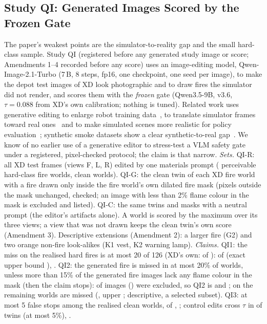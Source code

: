 \subsection{Study QI: Generated Images Scored by the Frozen Gate}\label{sec:moved-qi}
The paper's weakest points are the simulator-to-reality gap and the small hard-class sample. Study QI (registered before any generated study image or score; Amendments 1--4 recorded before any score) uses an image-editing model, Qwen-Image-2.1-Turbo (7\,B, 8 steps, fp16, one checkpoint, one seed per image), to make the depot test images of XD look photographic and to draw fires the simulator did not render, and scores them with the \emph{frozen} gate (Qwen3.5-9B, v3.6, $\tau=0.088$ from XD's own calibration; nothing is tuned). Related work uses generative editing to enlarge robot training data~\cite{yu2023rosie}, to translate simulator frames toward real ones~\cite{alhaija2025cosmostransfer,samak2025sim2realdiffusion} and to make simulated scenes more realistic for policy evaluation~\cite{benarous2025spie,li2024simpler}; synthetic smoke datasets show a clear synthetic-to-real gap~\cite{gaba2025wildfiresynthetic}. We know of no earlier use of a generative editor to stress-test a VLM safety gate under a registered, pixel-checked protocol; the claim is that narrow.
\emph{Sets.} QI-R: all XD test frames (views F, L, R) edited by one materials prompt (\QIRN{} perceivable hard-class fire worlds, \QIRCleanN{} clean worlds). QI-G: the clean twin of each XD fire world with a fire drawn only inside the fire world's own dilated fire mask (pixels outside the mask unchanged, checked; an image with less than 2\% flame colour in the mask is excluded and listed). QI-C: the same twins and masks with a neutral prompt (the editor's artifacts alone). A world is scored by the maximum over its three views; a view that was not drawn keeps the clean twin's own score (Amendment 3). Descriptive extensions (Amendment 2): a larger fire (G2) and two orange non-fire look-alikes (K1 vest, K2 warning lamp).
\emph{Claims.} QI1: the miss on the realised hard fires is at most 20 of 126 (XD's own: \QIBaseMiss{} of \QIBaseN): \QIRMiss{} of \QIRN{} (exact upper bound \QIRUpper), \QIClaimQIOne. QI2: the generated fire is missed in at most 20\% of worlds, unless more than 15\% of the generated fire images lack any flame colour in the mask (then the claim stops): \QIGExcl{} of \QIGGen{} images (\QIGExclShare) were excluded, so QI2 is \QIGStopped{} and \QIClaimQITwo; on the \QIGN{} remaining worlds \QIGMiss{} are missed (\QIGRate, upper \QIGUpper; descriptive, a selected subset). QI3: at most 5 false stops among the realised clean worlds, \QIRFalse{} of \QIRCleanN{}, \QIClaimQIThree; control edits cross $\tau$ in \QICFlips{} of \QICN{} twins (at most 5\%), \QIClaimQIThreec.
